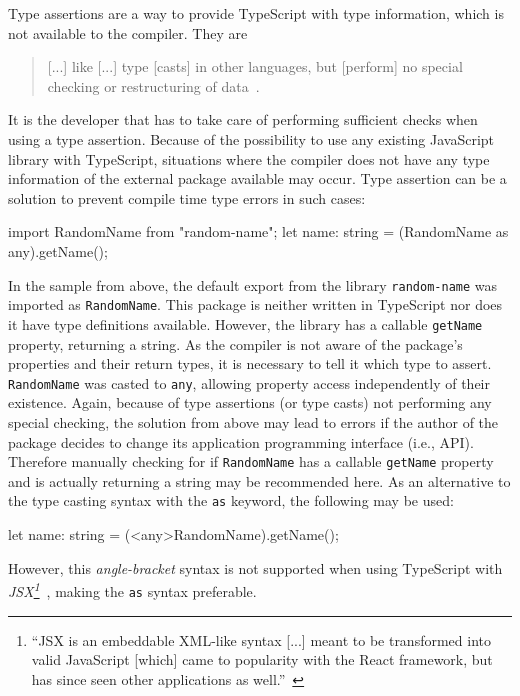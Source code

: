 Type assertions are a way to provide TypeScript with type information, which is not available to the compiler. They are 
\begin{quote}
  [...] like [...] type [casts] in other languages, but [perform] no special checking or restructuring of data~\cite{TypeScriptHandbook:BasicTypes}.
\end{quote}
It is the developer that has to take care of performing sufficient checks when using a type assertion. Because of the possibility to use any existing JavaScript library with TypeScript, situations where the compiler does not have any type information of the external package available may occur. Type assertion can be a solution to prevent compile time type errors in such cases:
\begin{JsCode}[numbers=none]
import RandomName from "random-name";
let name: string = (RandomName as any).getName();
\end{JsCode}
In the sample from above, the default export from the library \texttt{random-name} was imported as \texttt{RandomName}. This package is neither written in TypeScript nor does it have type definitions available. However, the library has a callable \texttt{getName} property, returning a string. As the compiler is not aware of the package's properties and their return types, it is necessary to tell it which type to assert. \texttt{RandomName} was casted to \texttt{any}, allowing property access independently of their existence. Again, because of type assertions (or type casts) not performing any special checking, the solution from above may lead to errors if the author of the package decides to change its application programming interface (i.e., API). Therefore manually checking for if \texttt{RandomName} has a callable \texttt{getName} property and is actually returning a string may be recommended here.
As an alternative to the type casting syntax with the \texttt{as} keyword, the following may be used:
\begin{JsCode}[numbers=none]
let name: string = (<any>RandomName).getName();
\end{JsCode}
However, this \emph{angle-bracket} syntax is not supported when using TypeScript with \emph{JSX\footnote{``JSX is an embeddable XML-like syntax [...] meant to be transformed into valid JavaScript [which] came to popularity with the React framework, but has since seen other applications as well.''~\cite{TypeScriptHandbook:JSX}}}~\cite{TypeScriptHandbook:BasicTypes}, making the \texttt{as} syntax preferable.

